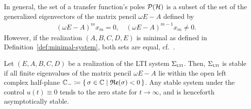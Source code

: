 \begin{remark}
    In general, the set of a transfer function's poles $\mathcal{P}(\mathcal{H})$ is a subset of the set of the generalized eigenvectors of the matrix pencil $\omega E - A$ defined by
    \begin{align*}
        {(\omega E - A)}^m x_m = 0,\quad {(\omega E - A)}^{m - 1} x_m \neq 0.
    \end{align*}
    However, if the realization $(A, B, C, D, E)$ is minimal as defined in Definition~\ref{def:minimal-system}, both sets are equal, cf.~\cite[Section~2]{Benner2017}.
\end{remark}

\begin{definition}\label{def:lti-stability}
    Let $(E, A, B, C, D)$ be a realization of the \ac{LTI} system $\Sigma_{\textnormal{\scshape lti}}$.
    Then, $\Sigma_{\textnormal{\scshape lti}}$ is stable if all finite eigenvalues of the matrix pencil $\omega E - A$ lie within the open left complex half-plane $\mathbb{C}_{-} \coloneqq \left\{\,\sigma \in \mathbb{C}\mid\mathfrak{Re}(\sigma) < 0\,\right\}$.
    Any stable system under the control $u(t) \equiv 0$ tends to the zero state for $t \to \infty$, and is henceforth asymptotically stable.
\end{definition}
